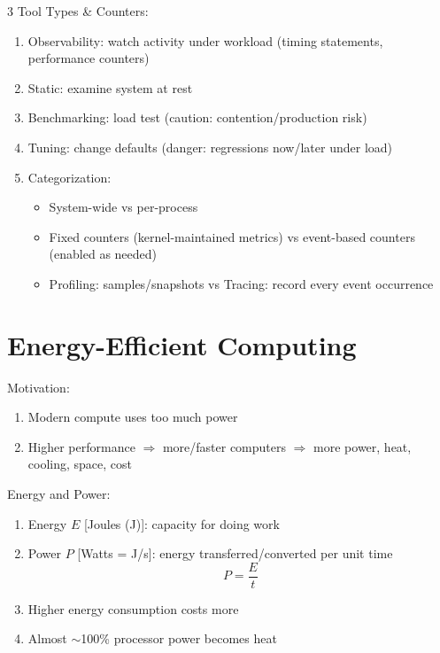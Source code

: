 \documentclass[12pt, a4paper]{article}
\begin{document}
\begin{multicols*}{3}
Tool Types \& Counters:
\begin{enumerate}[\roman*.]
  \item Observability: watch activity under workload (timing statements, performance counters)
  \item Static: examine system at rest
  \item Benchmarking: load test (caution: contention/production risk)
  \item Tuning: change defaults (danger: regressions now/later under load)
  \item Categorization:
    \begin{itemize}[leftmargin=*]\vspace{2pt}
      \item System-wide vs per-process
      \item Fixed counters (kernel-maintained metrics) vs event-based counters (enabled as needed)
      \item Profiling: samples/snapshots \quad vs \quad Tracing: record every event occurrence
    \end{itemize}
\end{enumerate}\vspace{0.5em}

\colbreak


\colbreak

\colbreak
\section{Energy-Efficient Computing}

Motivation:
\begin{enumerate}[\roman*.]
  \item Modern compute uses too much power
  \item Higher performance $\Rightarrow$ more/faster computers $\Rightarrow$ more power, heat, cooling, space, cost
\end{enumerate}

Energy and Power:
\begin{enumerate}[\roman*.]
  \item Energy $E$ [Joules (J)]: capacity for doing work
  \item Power $P$ [Watts = J/s]: energy transferred/converted per unit time
    \[
      P = \frac{E}{t}
    \]
  \item Higher energy consumption costs more
  \item Almost $\sim$100\% processor power becomes heat
\end{enumerate}


\end{multicols*}
\end{document}
